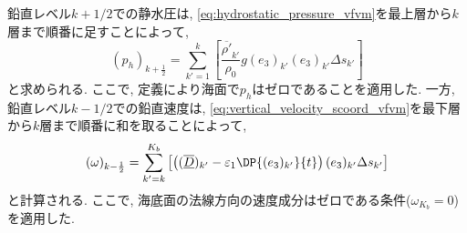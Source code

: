 鉛直レベル$k+1/2$での静水圧は, \eqref{eq:hydrostatic_pressure_vfvm}を最上層から$k$層まで順番に足すことによって, 
\begin{equation}
 (p_h)_{k+\frac{1}{2}} 
  = \sum_{k'=1}^k  \left[ 
    \dfrac{\overline{\rho'}_{k'}}{\rho_0}g(e_3)_{k'} 
     (e_3)_{k'} \Delta s_{k'} \right] 
\end{equation}
と求められる. 
ここで, 定義により海面で$p_h$はゼロであることを適用した. 
一方, 鉛直レベル$k-1/2$での鉛直速度は,
\eqref{eq:vertical_velocity_scoord_vfvm}を最下層から$k$層まで順番に和を取ることによって,
\begin{equation}
 (\omega)_{k-\frac{1}{2}} 
  =  \sum_{k'=k}^{K_b} \left[ \left(
     (\overline{\underline{D}})_{k'}
   - \varepsilon_1 \DP{(e_3)_{k'}}{t} \right) (e_3)_{k'} \Delta s_{k'} \right]
\end{equation}
と計算される. 
ここで, 海底面の法線方向の速度成分はゼロである条件($\omega_{K_b}=0$)を適用した. 

